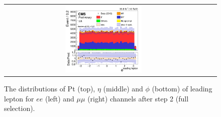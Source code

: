 \begin{figure}[ht]
\begin{center}
\begin{tabular}{ccc}
      \includegraphics[width=0.4\textwidth]{figures/tW/fig/Step2/mumu/H_lepton_led_phi.png}\\
    \end{tabular}
    \caption{The distributions of Pt (top), $\eta$ (middle) and $\phi$ (bottom) of leading lepton for $ee$ (left) and $\mu\mu$ (right) channels after step 2 (full selection).
    \label{fig:step2_leading_lepton}}
  \end{center}
\end{figure}

